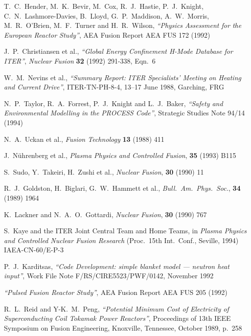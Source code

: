 \begin{thebibliography}{99}
T.\ C.\ Hender, M.\ K.\ Bevir, M.\ Cox, R.\ J.\ Hastie, P.\ J.\
Knight, C.\ N.\ Lashmore-Davies, B.\ Lloyd, G.\ P.\ Maddison, A.\ W.\
Morris, M.\ R.\ O'Brien, M.\ F.\ Turner and H.\ R.\ Wilson,
{\it ``Physics Assessment for the European Reactor Study''},
AEA Fusion Report AEA FUS 172
(1992)

J.\ P.\ Christiansen et al.,
{\it ``Global Energy Confinement H-Mode Database for ITER''},
{\it Nuclear Fusion} {\bf 32} (1992) 291-338, Eqn.\ 6

W.\ M.\ Nevins et al.,
{\it ``Summary Report: ITER Specialists' Meeting on Heating and
Current Drive''},
ITER-TN-PH-8-4,
13--17 June 1988, Garching, FRG

N.\ P.\ Taylor, R.\ A.\ Forrest, P.\ J.\ Knight and L.\ J.\ Baker,
{\it ``Safety and Environmental Modelling in the PROCESS Code''},
Strategic Studies Note 94/14
(1994)

N.\ A.\ Uckan et al.,
{\it Fusion Technology} {\bf 13} (1988) 411

J.\ N\"{u}hrenberg et al., {\it Plasma Physics and Controlled Fusion}, {\bf
35} (1993) B115

S.\ Sudo, Y.\ Takeiri, H.\ Zushi et al., {\it Nuclear Fusion}, {\bf 30} (1990)
11

R.\ J.\ Goldston, H.\ Biglari, G.\ W.\ Hammett et al., {\it Bull.\ Am.\ Phys.\
Soc.}, {\bf 34} (1989) 1964

\bibitem{LG}
K.\ Lackner and N.\ A.\ O.\ Gottardi, {\it Nuclear Fusion}, {\bf 30} (1990)
767

\bibitem{iter93h}
S.\ Kaye and the ITER Joint Central Team and Home Teams, in {\it Plasma
Physics and Controlled Nuclear Fusion Research} (Proc.\ 15th Int.\ Conf.,
Seville, 1994) IAEA-CN-60/E-P-3

\bibitem{Panos}
P.\ J.\ Karditsas, {\it ``\PS Code Development: simple blanket model ---
neutron heat input''},
Work File Note F/RS/CIRE5523/PWF/0142, November 1992

\bibitem{ELECTROWATT}
{\it ``Pulsed Fusion Reactor Study''},
AEA Fusion Report AEA FUS 205
(1992)

R.\ L.\ Reid and Y-K.\ M.\ Peng,
{\it ``Potential Minimum Cost of Electricity of Superconducting Coil
Tokamak Power Reactors''},
Proceedings of 13th IEEE Symposium on Fusion Engineering, Knoxville,
Tennessee, October 1989, p.\ 258


\end{thebibliography}
